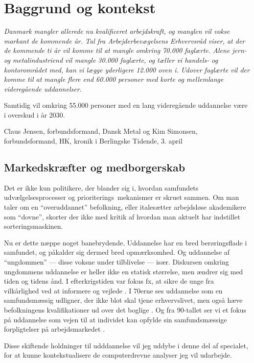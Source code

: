 \part{Baggrund og kontekst}\label{part:baggrund}
\epigraph{\itshape
Danmark mangler allerede nu kvalificeret arbejdskraft, og manglen vil vokse markant de kommende år. Tal fra Arbejderbevægelsens Erhvervsråd viser, at der de kommende ti år vil komme til at mangle omkring 70.000 faglærte. Alene jern- og metalindustriend vil mangle 30.000 faglærte, og tæller vi handels- og kontorområdet med, kan vi lægge yderligere 12.000 oven i. Udover faglærte vil der komme til at mangle flere end 60.000 personer med korte og mellemlange videregående uddannelser.

Samtidig vil omkring 55.000 personer med en lang videregående uddannelse være i overskud i år 2030.
}
{Claus Jensen, forbundsformand, Dansk Metal og Kim Simonsen, forbundsformand, HK, kronik i Berlingske Tidende, 3. april \citeyear{simonsenLadOsGore2016}}

\chapter{Markedskræfter og medborgerskab}\label{chap:marked}

Det er ikke kun politikere, der blander sig i, hvordan samfundets udvælgelsesprocesser og prioriterings\ mekanismer er skruet sammen.
Om man taler om en “overuddannet” befolkning, eller italesætter arbejdsløse akademikere som “dovne”, skorter der ikke med kritik af hvordan man aktuelt har indstillet sorteringsmaskinen.

Nu er dette næppe noget banebrydende.
Uddannelse har en bred berøringsflade i samfundet, og påkalder sig dermed bred opmærksomhed.
Og uddannelse af “ungdommen” — disse voksne under tilblivelse — især.
Diskursen omkring ungdommens uddannelse er heller ikke en statisk størrelse, men ændrer sig med tiden og tidens ånd.
I efterkrigstiden var fokus fx, at sikre de unge fra vilkårlighed ved at informere og vejlede \autocite[s 17ff]{juulDiskurserOmUngdom2013}.
I 70erne ses uddannelse som en samfundsmæssig udligner, der ikke blot skal tjene erhvervslivet, men også hæve befolkningens kvalifikationer ud over det boglige \autocite[s 15ff]{juulDiskurserOmUngdom2013}.
Og fra 90-tallet ser vi et fokus på uddannelse som vejen til at individet kan opfylde sin samfundsmæssige forpligtelser på arbejdsmarkedet \autocite[s. 18]{juulDiskurserOmUngdom2013}.

Disse skiftende holdninger til udddannelse vil jeg uddybe i denne del af specialet, for at kunne kontekstualisere de computerdrevne analyser jeg vil udarbejde.

